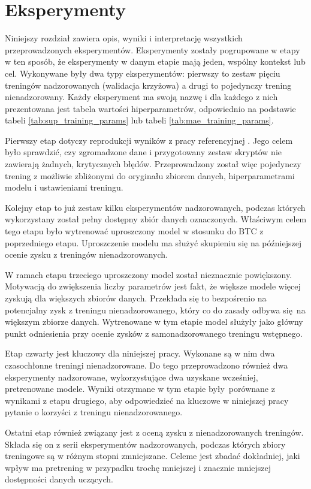 \chapter{Eksperymenty}

Niniejszy rozdział zawiera opis, wyniki i interpretację wszystkich przeprowadzonych eksperymentów. Eksperymenty zostały pogrupowane w etapy w ten sposób, że eksperymenty w danym etapie mają jeden, wspólny kontekst lub cel. Wykonywane były dwa typy eksperymentów: pierwszy to zestaw pięciu treningów nadzorowanych (walidacja krzyżowa) a drugi to pojedynczy trening nienadzorowany. Każdy eksperyment ma swoją nazwę i dla każdego z nich prezentowana jest tabela wartości hiperparametrów, odpowiednio na podstawie tabeli \ref{tab:sup_training_params} lub tabeli \ref{tab:mae_training_params}.

Pierwszy etap dotyczy reprodukcji wyników z pracy referencyjnej \cite{park_bi-directional_2019}. Jego celem było sprawdzić, czy zgromadzone dane i przygotowany zestaw skryptów nie zawierają żadnych, krytycznych błędów. Przeprowadzony został więc pojedynczy trening z możliwie zbliżonymi do oryginału zbiorem danych, hiperparametrami modelu i ustawieniami treningu.

Kolejny etap to już zestaw kilku eksperymentów nadzorowanych, podczas których wykorzystany został pełny dostępny zbiór danych oznaczonych. Właściwym celem tego etapu było wytrenować uproszczony model w stosunku do BTC z poprzedniego etapu. Uproszczenie modelu ma służyć skupieniu się na późniejszej ocenie zysku z treningów nienadzorowanych.

W ramach etapu trzeciego uproszczony model został nieznacznie powiększony. Motywacją do zwiększenia liczby parametrów jest fakt, że większe modele więcej zyskują dla większych zbiorów danych. Przekłada się to bezpośrenio na potencjalny zysk z treningu nienadzorowanego, który co do zasady odbywa się na większym zbiorze danych. Wytrenowane w tym etapie model służyły jako główny punkt odniesienia przy ocenie zysków z samonadzorowanego treningu wstępnego.

Etap czwarty jest kluczowy dla niniejszej pracy. Wykonane są w nim dwa czasochłonne treningi nienadzorowane. Do tego przeprowadzono również dwa eksperymenty nadzorowane, wykorzystujące dwa uzyskane wcześniej, pretrenowane modele. Wyniki otrzymane w tym etapie były porównane z wynikami z etapu drugiego, aby odpowiedzieć na kluczowe w niniejszej pracy pytanie o korzyści z treningu nienadzorowanego.

Ostatni etap również związany jest z oceną zysku z nienadzorowanych treningów. Składa się on z serii eksperymentów nadzorowanych, podczas których zbiory treningowe są w różnym stopni zmniejszane. Celeme jest zbadać dokładniej, jaki wpływ ma pretrening w przypadku trochę mniejszej i znacznie mniejszej dostępności danych uczących.



